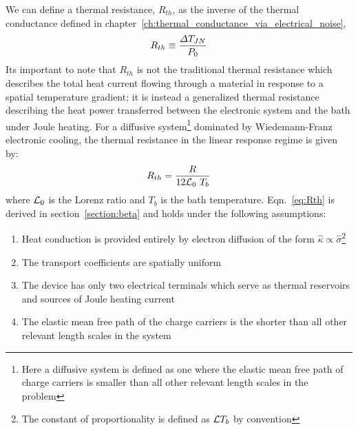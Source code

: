We can define a thermal resistance, $R_{th}$, as the inverse of the thermal conductance defined in chapter~\ref{ch:thermal_conductance_via_electrical_noise},
\begin{equation}
R_{th} \equiv \frac{\Delta T_{JN}}{P_0}
\end{equation}
Its important to note that $R_{th}$ is not the traditional thermal resistance which describes the total
heat current flowing through a material in response to a spatial temperature gradient; it is instead
a generalized thermal resistance describing the heat power transferred between the electronic
system and the bath under Joule heating. For a diffusive system\footnote{Here a diffusive system is defined as one where the elastic mean free path of charge carriers is smaller than all other relevant length scales in the problem} dominated by Wiedemann-Franz electronic cooling, the thermal resistance in the linear response regime is given by:
\begin{equation}\label{eq:Rth}
R_{th} = \frac{R}{12\mathcal{L}_0~T_b}
\end{equation}
where $\mathcal{L}_0$ is the Lorenz ratio and $T_b$ is the bath temperature. Eqn.~\ref{eq:Rth} is derived in section~\ref{section:beta} and holds under the following assumptions:
\begin{enumerate}
\item Heat conduction is provided entirely by electron diffusion of the form $\hat\kappa \propto \hat\sigma$\footnote{The constant of proportionality is defined as $\mathcal{L} T_b$ by convention}
\item The transport coefficients are spatially uniform
\item The device has only two electrical terminals which serve as thermal reservoirs and sources of Joule heating current
\item The elastic mean free path of the charge carriers is the shorter than all other relevant length scales in the system
\end{enumerate}
